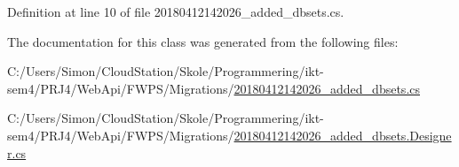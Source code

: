 Definition at line 10 of file 20180412142026\+\_\+added\+\_\+dbsets.\+cs.



The documentation for this class was generated from the following files\+:\begin{DoxyCompactItemize}
\item 
C\+:/\+Users/\+Simon/\+Cloud\+Station/\+Skole/\+Programmering/ikt-\/sem4/\+P\+R\+J4/\+Web\+Api/\+F\+W\+P\+S/\+Migrations/\mbox{\hyperlink{20180412142026__added__dbsets_8cs}{20180412142026\+\_\+added\+\_\+dbsets.\+cs}}\item 
C\+:/\+Users/\+Simon/\+Cloud\+Station/\+Skole/\+Programmering/ikt-\/sem4/\+P\+R\+J4/\+Web\+Api/\+F\+W\+P\+S/\+Migrations/\mbox{\hyperlink{20180412142026__added__dbsets_8_designer_8cs}{20180412142026\+\_\+added\+\_\+dbsets.\+Designer.\+cs}}\end{DoxyCompactItemize}
